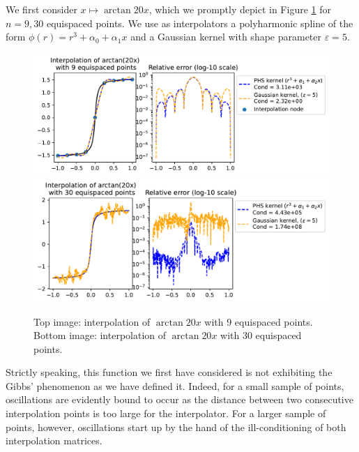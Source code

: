 \documentclass[12pt]{report} %
\begin{document}
We first consider $x \mapsto \arctan{20x}$, which we promptly depict in Figure \ref{fig:arctan-with-points} for $n=9, 30$ equispaced points. We use as interpolators a polyharmonic spline of the form $\phi(r) = r^3+\alpha_0+\alpha_1 x$ and a Gaussian kernel with shape parameter $\varepsilon=5$.

\begin{figure}[ht]
  \centering
  \includegraphics[width=\textwidth]{imagenes/experiments/1d/intro/arctan-with-9-pts.pdf}
  \includegraphics[width=\textwidth]{imagenes/experiments/1d/intro/arctan-with-30-pts.pdf}
  \caption{Top image: interpolation of $\arctan{20x}$ with 9 equispaced points. Bottom image: interpolation of $\arctan{20x}$ with 30 equispaced points. }
  \label{fig:arctan-with-points}
\end{figure}

Strictly speaking, this function we first have considered is not exhibiting the Gibbs' phenomenon as we have defined it. Indeed, for a small sample of points, oscillations are evidently bound to occur as the distance between two consecutive interpolation points is too large for the interpolator. For a larger sample of points, however, oscillations start up by the hand of the ill-conditioning of both interpolation matrices.
\end{document}

